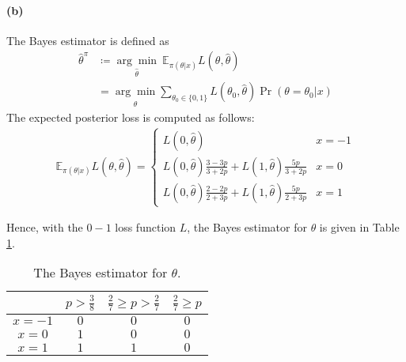 \paragraph{(b)}
The Bayes estimator is defined as 
\begin{align*}
    \hat{\theta}^\pi 
    &\coloneqq \underset{\hat{\theta}}{\arg \min} \ \mathbb{E}_{\pi(\theta \vert x)} L(\theta, \hat{\theta}) \\ 
    &= \underset{\hat{\theta}}{\arg \min} \sum_{\theta_0 \in \{0, 1\}} L(\theta_0, \hat{\theta}) \Pr(\theta=\theta_0 \vert x)
\end{align*}
The expected posterior loss is computed as follows:
\begin{align*}
    \mathbb{E}_{\pi(\theta \vert x)} L(\theta, \hat{\theta}) = 
    \begin{cases}
        L(0, \hat{\theta}) & x = -1 \\
        L(0, \hat{\theta}) \frac{3-3p}{3+2p} + L(1, \hat{\theta}) \frac{5p}{3+2p} & x=0\\
        L(0, \hat{\theta}) \frac{2-2p}{2+3p} + L(1, \hat{\theta}) \frac{5p}{2+3p} & x=1
    \end{cases}
\end{align*}

Hence, with the $0-1$ loss function $L$, the Bayes estimator for $\theta$ is given in Table \ref{tab:4-1-estimator}.
\begin{table}[htp]
    \centering
    \begin{tabular}{c c c c}
    \toprule
           & $p > \frac{3}{8}$ & $ \frac{2}{7} \geq p > \frac{2}{7}$ & $\frac{2}{7} \geq p $\\
    \midrule
    $x=-1$ & $0$ & $0$ & $0$ \\
    $x=0$  & $1$ & $0$ & $0$ \\
    $x=1$ & $1$ & $1$ & $0$ \\
    \bottomrule
    \end{tabular}
    \caption{The Bayes estimator for $\theta$. }
    \label{tab:4-1-estimator}
\end{table}

